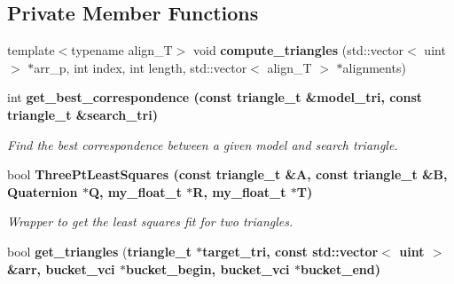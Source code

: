 \subsection*{Private Member Functions}
\begin{CompactItemize}
\item 
template$<$typename align\_\-T$>$ void \textbf{compute\_\-triangles} (std::vector$<$ uint $>$ $\ast$arr\_\-p, int index, int length, std::vector$<$ align\_\-T $>$ $\ast$alignments)\label{classASCbase_1_1MatchTriangles_147928ad10a438af6c6e6ee6cefe10df}

\item 
int \bf{get\_\-best\_\-correspondence} (const \bf{triangle\_\-t} \&model\_\-tri, const \bf{triangle\_\-t} \&search\_\-tri)
\begin{CompactList}\small\item\em Find the best correspondence between a given model and search triangle. \item\end{CompactList}\item 
bool \bf{Three\-Pt\-Least\-Squares} (const \bf{triangle\_\-t} \&A, const \bf{triangle\_\-t} \&B, Quaternion $\ast$Q, my\_\-float\_\-t $\ast$R, my\_\-float\_\-t $\ast$T)
\begin{CompactList}\small\item\em Wrapper to get the least squares fit for two triangles. \item\end{CompactList}\item 
bool \textbf{get\_\-triangles} (\bf{triangle\_\-t} $\ast$target\_\-tri, const std::vector$<$ uint $>$ \&arr, bucket\_\-vci $\ast$bucket\_\-begin, bucket\_\-vci $\ast$bucket\_\-end)\label{classASCbase_1_1MatchTriangles_6212c1fe978ef723724ed5029963e109}

\end{CompactItemize}
